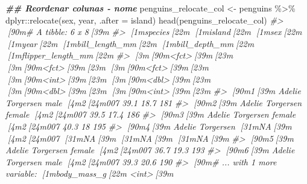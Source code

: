 \documentclass[
]{book}
\newenvironment{Shaded}{\begin{snugshade}}{\end{snugshade}}
\newcommand{\AttributeTok}[1]{\textcolor[rgb]{0.61,0.61,0.61}{#1}}
\newcommand{\CommentTok}[1]{\textcolor[rgb]{0.37,0.37,0.37}{\textit{#1}}}
\newcommand{\DocumentationTok}[1]{\textcolor[rgb]{0.37,0.37,0.37}{\textbf{\textit{#1}}}}
\newcommand{\FunctionTok}[1]{\textcolor[rgb]{0,0,0}{#1}}
\newcommand{\NormalTok}[1]{#1}
\newcommand{\OtherTok}[1]{\textcolor[rgb]{0.37,0.37,0.37}{#1}}
\newcommand{\SpecialCharTok}[1]{\textcolor[rgb]{0,0,0}{#1}}
\begin{document}
\begin{Shaded}
\begin{Highlighting}[]
\DocumentationTok{\#\# Reordenar colunas {-} nome}
\NormalTok{penguins\_relocate\_col }\OtherTok{\textless{}{-}}\NormalTok{ penguins }\SpecialCharTok{\%\textgreater{}\%} 
\NormalTok{ dplyr}\SpecialCharTok{::}\FunctionTok{relocate}\NormalTok{(sex, year, }\AttributeTok{.after =}\NormalTok{ island)}
\FunctionTok{head}\NormalTok{(penguins\_relocate\_col)}
\CommentTok{\#\textgreater{} [90m\# A tibble: 6 x 8[39m}
\CommentTok{\#\textgreater{}   [1mspecies[22m [1misland[22m    [1msex[22m     [1myear[22m [1mbill\_length\_mm[22m [1mbill\_depth\_mm[22m [1mflipper\_length\_mm[22m}
\CommentTok{\#\textgreater{}   [3m[90m\textless{}fct\textgreater{}[39m[23m   [3m[90m\textless{}fct\textgreater{}[39m[23m     [3m[90m\textless{}fct\textgreater{}[39m[23m  [3m[90m\textless{}int\textgreater{}[39m[23m          [3m[90m\textless{}dbl\textgreater{}[39m[23m         [3m[90m\textless{}dbl\textgreater{}[39m[23m             [3m[90m\textless{}int\textgreater{}[39m[23m}
\CommentTok{\#\textgreater{} [90m1[39m Adelie  Torgersen male    [4m2[24m007           39.1          18.7               181}
\CommentTok{\#\textgreater{} [90m2[39m Adelie  Torgersen female  [4m2[24m007           39.5          17.4               186}
\CommentTok{\#\textgreater{} [90m3[39m Adelie  Torgersen female  [4m2[24m007           40.3          18                 195}
\CommentTok{\#\textgreater{} [90m4[39m Adelie  Torgersen [31mNA[39m      [4m2[24m007           [31mNA[39m            [31mNA[39m                  [31mNA[39m}
\CommentTok{\#\textgreater{} [90m5[39m Adelie  Torgersen female  [4m2[24m007           36.7          19.3               193}
\CommentTok{\#\textgreater{} [90m6[39m Adelie  Torgersen male    [4m2[24m007           39.3          20.6               190}
\CommentTok{\#\textgreater{} [90m\# ... with 1 more variable: [1mbody\_mass\_g[22m \textless{}int\textgreater{}[39m}


\end{Highlighting}
\end{Shaded}
\end{document}
